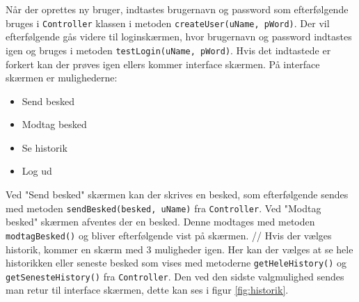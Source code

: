 \newline
Når der oprettes ny bruger, indtastes brugernavn og password som efterfølgende bruges i \texttt{Controller} klassen i metoden \texttt{createUser(uName, pWord)}. Der vil efterfølgende gås videre til loginskærmen, hvor brugernavn og password indtastes igen og bruges i metoden \texttt{testLogin(uName, pWord)}. Hvis det indtastede er forkert kan der prøves igen ellers kommer interface skærmen.
\newline
På interface skærmen er mulighederne:
\begin{itemize}
	\item Send besked
	\item Modtag besked
	\item Se historik 
	\item Log ud
\end{itemize}
Ved "Send besked" skærmen kan der skrives en besked, som efterfølgende sendes med metoden \texttt{sendBesked(besked, uName)} fra \texttt{Controller}. Ved "Modtag besked" skærmen afventes der en besked. Denne modtages med metoden \texttt{modtagBesked()} og bliver efterfølgende vist på skærmen.
//
Hvis der vælges historik, kommer en skærm med 3 muligheder igen. Her kan der vælges at se hele historikken eller seneste besked som vises med metoderne \texttt{getHeleHistory()} og \texttt{getSenesteHistory()} fra \texttt{Controller}. Den ved den sidste valgmulighed sendes man retur til interface skærmen, dette kan ses i figur \ref{fig:historik}.
